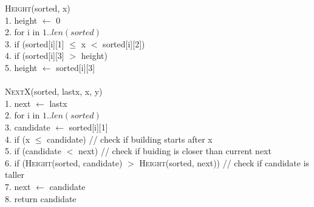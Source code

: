 \documentclass{article}
\begin{document}
\begin{enumerate}
\begin{algorithm}
        \textsc{Height}(sorted, x) \\
        1. \hspace{0em} height $\leftarrow$ 0 \\
        2. \hspace{0em} for i in $1..len(sorted)$ \\
        3. \hspace{2em}     if (sorted[i][1] $\leq$ x $<$ sorted[i][2]) \\
        4. \hspace{4em}         if (sorted[i][3] $>$ height) \\
        5. \hspace{6em}             height $\leftarrow$ sorted[i][3] \\\\

        \textsc{NextX}(sorted, lastx, x, y) \\
        1. \hspace{0em} next $\leftarrow$ lastx \\
        2. \hspace{0em} for i in $1..len(sorted)$ \\
        3. \hspace{2em}     candidate $\leftarrow$ sorted[i][1]\ \\
        4. \hspace{2em}     if (x $\leq$ candidate) \hspace{2em} // check if building starts after x \\
        5. \hspace{4em}         if (candidate $<$ next) \hspace{2em} // check if buiding is closer than current next \\
        6. \hspace{6em}              if (\textsc{Height}(sorted, candidate) $>$ \textsc{Height}(sorted, next)) \hspace{2em} // check if candidate is taller \\
        7. \hspace{8em}                  next $\leftarrow$ candidate \\
        8. \hspace{0em} return candidate
    \end{algorithm}
\end{enumerate}
\end{document}
